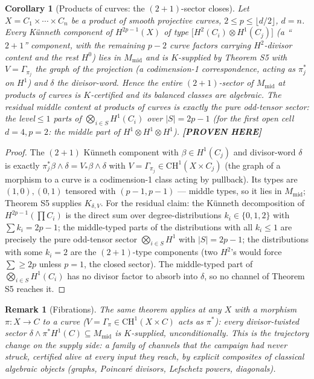 \documentclass[11pt]{article}
\newtheorem{corollary}[theorem]{Corollary}
\newtheorem{remark}[theorem]{Remark}
\newcommand{\PROVEN}{\textbf{[PROVEN HERE]}}
\newcommand{\CH}{\mathrm{CH}}
\begin{document}
\begin{corollary}[Products of curves: the $(2{+}1)$-sector closes]\label{cor:s5}
Let $X=C_1\times\cdots\times C_n$ be a product of smooth projective curves,
$2\le p\le\lfloor d/2\rfloor$, $d=n$. Every Künneth component of
$H^{2p-1}(X)$ of type $\bigl[H^{2}(C_i)\otimes H^{1}(C_j)\bigr]$ (a
``$2{+}1$'' component, with the remaining $p-2$ curve factors carrying
$H^{2}$-divisor content and the rest $H^{0}$) lies in
$M_{\mathrm{mid}}$ and is $K$-supplied by Theorem \emph{S5} with
$V=\Gamma_{\pi_j}$ the graph of the projection (a codimension-1
correspondence, acting as $\pi_j^{*}$ on $H^{1}$) and
$\delta$ the divisor-word. Hence the entire $(2{+}1)$-sector of
$M_{\mathrm{mid}}$ at products of curves is $K$-certified and its balanced
classes are algebraic. The \emph{residual} middle content at products of
curves is exactly the pure odd-tensor sector: the level${}\le{}1$ parts of
$\bigotimes_{i\in S}H^{1}(C_i)$ over $|S|=2p-1$ (for the first open cell
$d=4,p=2$: the middle part of $H^{1}\otimes H^{1}\otimes H^{1}$).
\PROVEN{}
\end{corollary}

\begin{proof}
The $(2{+}1)$ Künneth component with $\beta\in H^{1}(C_j)$ and divisor-word
$\delta$ is exactly $\pi_j^{*}\beta\wedge\delta=
V_{*}\beta\wedge\delta$ with $V=\Gamma_{\pi_j}\in\CH^{1}(X\times C_j)$
(the graph of a morphism to a curve is a codimension-1 class acting by
pullback). Its types are $(1,0),(0,1)$ tensored with $(p-1,p-1)$ --- middle
types, so it lies in $M_{\mathrm{mid}}$; Theorem S5 supplies
$K_{\delta,V}$. For the residual claim: the Künneth decomposition of
$H^{2p-1}(\prod C_i)$ is the direct sum over degree-distributions
$k_i\in\{0,1,2\}$ with $\sum k_i=2p-1$; the middle-typed parts of the
distributions with all $k_i\le1$ are precisely the pure odd-tensor sector
$\bigotimes_{i\in S}H^{1}$ with $|S|=2p-1$; the distributions with some
$k_i=2$ are the $(2{+}1)$-type components (two $H^{2}$'s would force
$\sum\ge2p$ unless $p=1$, the closed sector). The middle-typed part of
$\bigotimes_{i\in S}H^{1}(C_i)$ has no divisor factor to absorb into
$\delta$, so no channel of Theorem S5 reaches it.
\end{proof}

\begin{remark}[Fibrations]
The same theorem applies at \emph{any} $X$ with a morphism $\pi\colon X\to C$
to a curve ($V=\Gamma_\pi\in\CH^{1}(X\times C)$ acts as $\pi^{*}$): every
divisor-twisted sector $\delta\wedge\pi^{*}H^{1}(C)\subseteq M_{\mathrm{mid}}$
is $K$-supplied, unconditionally. This is the trajectory change on the supply
side: a family of channels that the campaign had never struck, certified
alive at every input they reach, by explicit composites of classical
algebraic objects (graphs, Poincaré divisors, Lefschetz powers, diagonals).
\end{remark}
\end{document}
